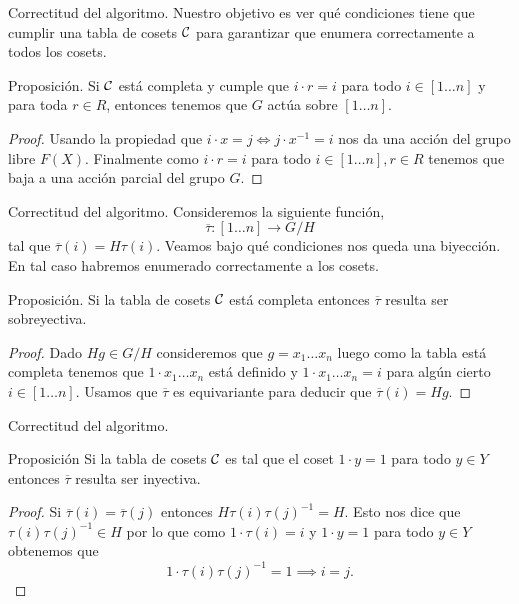 \documentclass[aspectratio=169, 9pt]{beamer}
\newcommand{\In}{[1 \dots n]}
\newcommand{\ol}{\overline}
\newcommand{\Co}{{\cal{C}}}
\begin{document}
\begin{frame}[fragile]{Correctitud del algoritmo.}
	Nuestro objetivo es ver qué condiciones tiene que cumplir una tabla de cosets $\Co$ para garantizar que enumera correctamente a todos los cosets.
	\pause
	\begin{alertblock}{Proposición.}
		Si $\Co$ está completa y cumple que  $i \cdot r = i$ para todo $i \in \In$ y para toda $r \in R$, entonces tenemos que $G$ actúa sobre $\In$.
	\end{alertblock}
	\medskip
	\pause
	\begin{proof}
		Usando la propiedad que $i \cdot x = j \iff j\cdot x^{-1} = i$ nos da una acción del grupo libre $F(X)$.
		\pause
		Finalmente como $i \cdot r = i$ para todo $i \in \In, r \in R$ tenemos que baja a una acción parcial del grupo $G$. 
	\end{proof}
\end{frame}


\begin{frame}[fragile]{Correctitud del algoritmo.}
	Consideremos la siguiente función,
	\[
	\ol \tau: \In \to G/H
	\]
	tal que $\ol \tau (i) = H \tau (i)$.
	\pause
	Veamos bajo qué condiciones nos queda una biyección. 
	En tal caso habremos enumerado correctamente a los cosets.
	\medskip
	
	
	
	\begin{alertblock}{Proposición.}
		Si la tabla de cosets $\Co$ está completa entonces $\ol \tau$ resulta ser sobreyectiva.
	\end{alertblock}
	\pause
	
	\begin{proof}
		Dado $Hg \in G/H$ consideremos que $g = x_1 \dots x_n$ \pause luego como la tabla está completa tenemos que $1 \cdot x_1 \dots x_n$ está definido y $1 \cdot x_1 \dots x_n  = i$ para algún cierto $i \in \In$.
		\pause
		Usamos que $\ol \tau$ es equivariante para deducir que $\ol \tau (i) = Hg$.
	\end{proof}
	
	
	
	
\end{frame}

\begin{frame}[fragile]{Correctitud del algoritmo.}
	\begin{alertblock}{Proposición}
		Si la tabla de cosets $\Co$ es tal que el coset $1 \cdot y = 1$ para todo $y \in Y$ entonces $\ol \tau$ resulta ser inyectiva.
	\end{alertblock}
	\pause
	\begin{proof}
		Si $\ol \tau (i) = \ol \tau (j)$ entonces $H \tau (i) \tau (j)^{-1} = H$.
		\pause
		Esto nos dice que $\tau (i) \tau(j)^{-1} \in H$ por lo que como $ 1 \cdot {\tau(i)} = i$ y  $1 \cdot y = 1$ para todo $y \in Y$ obtenemos que 
		\[
		1 \cdot \tau(i)\tau(j)^{-1} = 1 \implies i = j.
		\]   
	\end{proof}
\end{frame}
\end{document}
